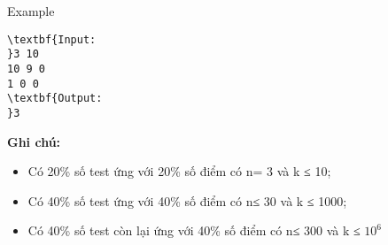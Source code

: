 Example
\begin{verbatim}
\textbf{Input:
}3 10
10 9 0
1 0 0
\textbf{Output:
}3
\end{verbatim}

\textbf{\textbf{Ghi chú:}}
\begin{itemize}
	\item Có 20\% số test ứng với 20\% số điểm có n= 3 và k ≤ 10;
	\item Có 40\% số test ứng với 40\% số điểm có n≤ 30 và k ≤ 1000;
	\item Có 40\% số test còn lại ứng với 40\% số điểm có n≤ 300 và k ≤ $10^{6}$
\end{itemize}